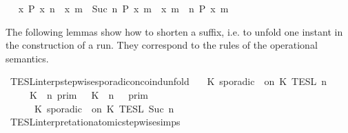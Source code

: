 \begin{isabellebody}
\ \isamarkupfalse%
\ {\isacartoucheopen}{\isacharbraceleft}x{\isachardot}\ P\ x\ n{\isacharbraceright}\ {\isasymunion}\ {\isacharbraceleft}x{\isachardot}\ {\isasymexists}m\ {\isasymge}\ Suc\ n{\isachardot}\ P\ x\ m{\isacharbraceright}\ {\isasymsubseteq}\ {\isacharbraceleft}x{\isachardot}\ {\isasymexists}m\ {\isasymge}\ n{\isachardot}\ P\ x\ m{\isacharbraceright}{\isacartoucheclose}\ \isacommand{{\isachardot}{\isachardot}}\isamarkupfalse%
\isanewline
{}\isamarkupfalse%
%
\endisatagproof
{\isafoldproof}%
%
\isadelimproof
%
\endisadelimproof
%
\isadelimdocument
%
\endisadelimdocument
%
\isatagdocument
%
\isamarkuptrue%
%
\endisatagdocument
{\isafolddocument}%
%
\isadelimdocument
%
\endisadelimdocument
%
\begin{isamarkuptext}%
The following lemmas show how  to shorten a suffix, i.e. to unfold one instant 
  in the construction of a run. They correspond to the rules of the operational 
  semantics.%
\end{isamarkuptext}\isamarkuptrue%
\isamarkupfalse%
\ TESL{\isacharunderscore}interp{\isacharunderscore}stepwise{\isacharunderscore}sporadicon{\isacharunderscore}coind{\isacharunderscore}unfold{\isacharcolon}\isanewline
\ \ {\isacartoucheopen}{\isasymlbrakk}\ K\ sporadic\ {\isasymtau}\ on\ K\ {\isasymrbrakk}\isactrlsub T\isactrlsub E\isactrlsub S\isactrlsub L\isactrlbsup {\isasymge}\ n\isactrlesup \ {\isacharequal}\isanewline
\ \ \ \ {\isasymlbrakk}\ K\ {\isasymUp}\ n\ {\isasymrbrakk}\isactrlsub p\isactrlsub r\isactrlsub i\isactrlsub m\ {\isasyminter}\ {\isasymlbrakk}\ K\ {\isasymDown}\ n\ {\isacharat}\ {\isasymtau}\ {\isasymrbrakk}\isactrlsub p\isactrlsub r\isactrlsub i\isactrlsub m\ \ \ \ \ \ \ \ %
\isanewline
\ \ \ \ {\isasymunion}\ {\isasymlbrakk}\ K\ sporadic\ {\isasymtau}\ on\ K\ {\isasymrbrakk}\isactrlsub T\isactrlsub E\isactrlsub S\isactrlsub L\isactrlbsup {\isasymge}\ Suc\ n\isactrlesup {\isacartoucheclose}\ \ \ %
\isanewline
%
\isadelimproof
%
\endisadelimproof
%
\isatagproof
{}\isamarkupfalse%
\ TESL{\isacharunderscore}interpretation{\isacharunderscore}atomic{\isacharunderscore}stepwise{\isachardot}simps{\isacharparenleft}{}{\isacharparenright}\isanewline

\end{isabellebody}
